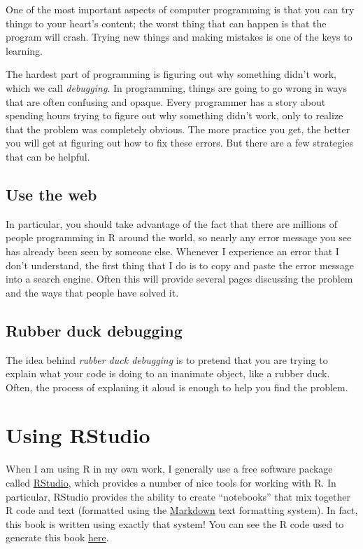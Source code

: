 \documentclass[12pt,]{book}
\begin{document}
One of the most important aspects of computer programming is that you can try things to your heart's content; the worst thing that can happen is that the program will crash. Trying new things and making mistakes is one of the keys to learning.

The hardest part of programming is figuring out why something didn't work, which we call \emph{debugging}. In programming, things are going to go wrong in ways that are often confusing and opaque. Every programmer has a story about spending hours trying to figure out why something didn't work, only to realize that the problem was completely obvious. The more practice you get, the better you will get at figuring out how to fix these errors. But there are a few strategies that can be helpful.

\hypertarget{use-the-web}{%
\subsection{Use the web}\label{use-the-web}}

In particular, you should take advantage of the fact that there are millions of people programming in R around the world, so nearly any error message you see has already been seen by someone else. Whenever I experience an error that I don't understand, the first thing that I do is to copy and paste the error message into a search engine. Often this will provide several pages discussing the problem and the ways that people have solved it.

\hypertarget{rubber-duck-debugging}{%
\subsection{Rubber duck debugging}\label{rubber-duck-debugging}}

The idea behind \emph{rubber duck debugging} is to pretend that you are trying to explain what your code is doing to an inanimate object, like a rubber duck. Often, the process of explaning it aloud is enough to help you find the problem.

\hypertarget{using-rstudio}{%
\section{Using RStudio}\label{using-rstudio}}

When I am using R in my own work, I generally use a free software package called \href{https://rstudio.com/}{RStudio}, which provides a number of nice tools for working with R. In particular, RStudio provides the ability to create ``notebooks'' that mix together R code and text (formatted using the \href{https://daringfireball.net/projects/markdown/}{Markdown} text formatting system). In fact, this book is written using exactly that system! You can see the R code used to generate this book \href{https://github.com/poldrack/psych10-book}{here}.
\end{document}
